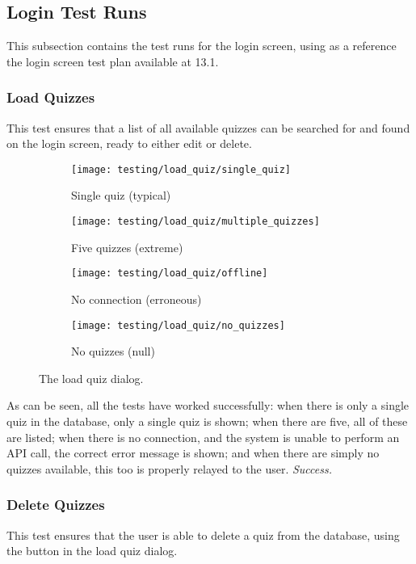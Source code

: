 \subsection{Login Test Runs}
This subsection contains the test runs for the login screen, using as a reference the login screen test plan available at 13.1.

\subsubsection{Load Quizzes}
This test ensures that a list of all available quizzes can be searched for and found on the login screen, ready to either edit or delete.

\begin{figure}[!htbp]
\centering
\begin{subfigure}{0.5\textwidth}
  \centering
  \texttt{[image: testing/load\_quiz/single\_quiz]}
  \caption{Single quiz (typical)}
  \label{fig:sub1}
\end{subfigure}%
\begin{subfigure}{0.5\textwidth}
  \centering
  \texttt{[image: testing/load\_quiz/multiple\_quizzes]}
  \caption{Five quizzes (extreme)}
  \label{fig:sub2}
\end{subfigure}
\begin{subfigure}{0.5\textwidth}
  \centering
  \texttt{[image: testing/load\_quiz/offline]}
  \caption{No connection (erroneous)}
  \label{fig:sub2}
\end{subfigure}
\begin{subfigure}{0.5\textwidth}
  \centering
  \texttt{[image: testing/load\_quiz/no\_quizzes]}
  \caption{No quizzes (null)}
  \label{fig:sub2}
\end{subfigure}
\caption{The load quiz dialog.}
\label{fig:test}
\end{figure}
As can be seen, all the tests have worked successfully: when there is only a single quiz in the database, only a single quiz is shown; when there are five, all of these are listed; when there is no connection, and the system is unable to perform an API call, the correct error message is shown; and when there are simply no quizzes available, this too is properly relayed to the user. \textit{Success.}


\subsubsection{Delete Quizzes}
This test ensures that the user is able to delete a quiz from the database, using the button in the load quiz dialog.

